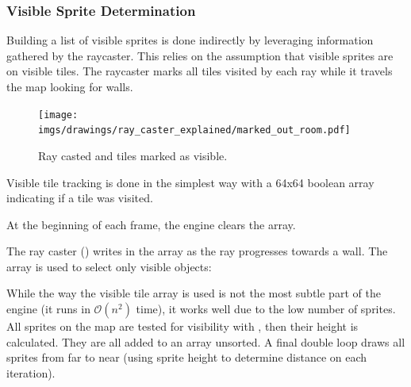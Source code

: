\subsubsection{Visible Sprite Determination}
Building a list of visible sprites is done indirectly by leveraging information gathered by the raycaster. This relies on the assumption that visible sprites are on visible tiles. The raycaster marks all tiles visited by each ray while it travels the map looking for walls.\\
\begin{figure}[H]
  \centering
  \texttt{[image: imgs/drawings/ray\_caster\_explained/marked\_out\_room.pdf]}
 \caption{Ray casted and tiles marked as visible.} 
\end{figure}
Visible tile tracking is done in the simplest way with a 64x64 boolean array indicating if a tile was visited.\\
\par
\par
\begin{minipage}{\textwidth}
  
\end{minipage}
\par

 At the beginning of each frame, the engine clears the array.\\
\par
\begin{minipage}{\textwidth}
 
 \end{minipage}
 \par
The ray caster () writes  in the  array as the ray progresses towards a wall. The array is used to select only visible objects:\\
\par

\par
\begin{minipage}{\textwidth}
 
 \end{minipage}
 \par

While the way the visible tile array is used is not the most subtle part of the engine (it runs in $\mathcal{O}(n^2)$ time), it works well due to the low number of sprites. All sprites on the map are tested for visibility with , then their height is calculated. They are all added to an array unsorted. A final double loop draws all sprites from far to near (using sprite height to determine distance on each iteration).\\ 




